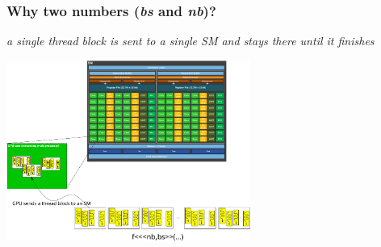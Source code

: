\documentclass[12pt,dvipdfmx]{beamer}
\newcommand{\ao}[1]{{\color{blue}#1}}
\begin{document}
\begin{frame}
  \frametitle{Why two numbers ({\it bs} and {\it nb})?}

  \ao{\it a single thread block is sent to a single SM
    and stays there until it finishes}

  \begin{center}
    \includegraphics[width=0.6\textwidth]{out/pdf/svg/sm_and_blocks_1.pdf}
  \end{center}
\end{frame}
\end{document}
